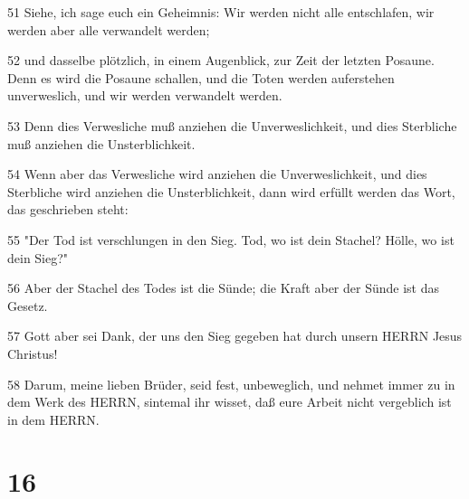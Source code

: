 \par 51 Siehe, ich sage euch ein Geheimnis: Wir werden nicht alle entschlafen, wir werden aber alle verwandelt werden;
\par 52 und dasselbe plötzlich, in einem Augenblick, zur Zeit der letzten Posaune. Denn es wird die Posaune schallen, und die Toten werden auferstehen unverweslich, und wir werden verwandelt werden.
\par 53 Denn dies Verwesliche muß anziehen die Unverweslichkeit, und dies Sterbliche muß anziehen die Unsterblichkeit.
\par 54 Wenn aber das Verwesliche wird anziehen die Unverweslichkeit, und dies Sterbliche wird anziehen die Unsterblichkeit, dann wird erfüllt werden das Wort, das geschrieben steht:
\par 55 "Der Tod ist verschlungen in den Sieg. Tod, wo ist dein Stachel? Hölle, wo ist dein Sieg?"
\par 56 Aber der Stachel des Todes ist die Sünde; die Kraft aber der Sünde ist das Gesetz.
\par 57 Gott aber sei Dank, der uns den Sieg gegeben hat durch unsern HERRN Jesus Christus!
\par 58 Darum, meine lieben Brüder, seid fest, unbeweglich, und nehmet immer zu in dem Werk des HERRN, sintemal ihr wisset, daß eure Arbeit nicht vergeblich ist in dem HERRN.

\chapter{16}

